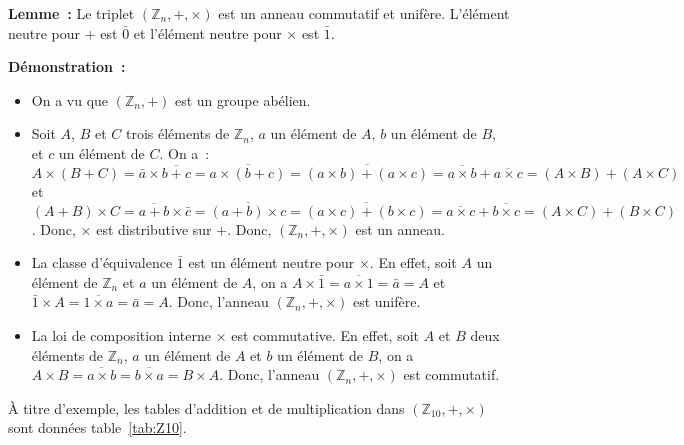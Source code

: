 \done

\medskip

\noindent\textbf{Lemme :} Le triplet $\left( \mathbb{Z}_n, +, \times \right)$ est un anneau commutatif et unifère. 
    L'élément neutre pour $+$ est $\bar{0}$ et l'élément neutre pour $\times$ est $\bar{1}$.

\medskip

\noindent\textbf{Démonstration :} 
\begin{itemize}[nosep]
    \item On a vu que $\left( \mathbb{Z}_n, + \right)$ est un groupe abélien.
    \item Soit $A$, $B$ et $C$ trois éléments de $\mathbb{Z}_n$, $a$ un élément de $A$, $b$ un élément de $B$, et $c$ un élément de $C$.
        On a : $A \times (B + C) = \bar{a} \times \overline{b+c} = \overline{a \times (b+c)} = \overline{(a \times b) + (a \times c)} = \overline{a \times b} + \overline{a \times c} = (A \times B) + (A \times C)$ et $(A+B) \times C  = \overline{a+b} \times \bar{c} = \overline{(a+b) \times c} = \overline{(a \times c) + (b \times c)} = \overline{a \times c} + \overline{b \times c} = (A \times C) + (B \times C)$.
        Donc, $\times$ est distributive sur $+$.
        Donc, $\left( \mathbb{Z}_n, +, \times \right)$ est un anneau.
    \item La classe d'équivalence $\bar{1}$ est un élément neutre pour $\times$. 
        En effet, soit $A$ un élément de $\mathbb{Z}_n$ et $a$ un élément de $A$, on a $A \times \bar{1} = \overline{a \times 1} = \bar{a} = A$ et $\bar{1} \times A = \overline{1 \times a} = \bar{a} = A$.
        Donc, l'anneau $\left( \mathbb{Z}_n, +, \times \right)$ est unifère.
    \item La loi de composition interne $\times$ est commutative.
        En effet, soit $A$ et $B$ deux éléments de $\mathbb{Z}_n$, $a$ un élément de $A$ et $b$ un élément de $B$, on a $A \times B = \overline{a \times b} = \overline{b \times a} = B \times A$.
        Donc, l'anneau $\left( \mathbb{Z}_n, +, \times \right)$ est commutatif.
\end{itemize}

\done

\medskip

À titre d'exemple, les tables d'addition et de multiplication dans $(\mathbb{Z}_10, +, \times)$ sont données table~\ref{tab:Z10}.

